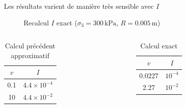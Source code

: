 \documentclass[10pt]{beamer}
\begin{document}
\begin{frame}{Les résultats varient de manière très sensible avec $I$}
    \begin{figure}[h]
        \centering
        \scalebox{0.5}{}
        \caption{Recalcul $I$ exact ($\sigma_3 = 300\,\text{kPa}$, $R = 0.005\,\text{m}$)}
    \end{figure}
    \begin{columns}
        \begin{column}{0.45\textwidth}
            \begin{table}[h]
                \centering
                \begin{tabular}{c c}
                    \hline
                    $v$ & $I$                  \\
                    \hline
                    0.1 & $4.4 \times 10^{-4}$ \\
                    10  & $4.4 \times 10^{-2}$ \\
                    \hline
                \end{tabular}
                \caption{Calcul précédent approximatif}
            \end{table}
        \end{column}
        \begin{column}{0.45\textwidth}
            \begin{table}[h]
                \centering
                \begin{tabular}{c c}
                    \hline
                    $v$    & $I$       \\
                    \hline
                    0.0227 & $10^{-4}$ \\
                    2.27   & $10^{-2}$ \\
                    \hline
                \end{tabular}
                \caption{Calcul exact}
            \end{table}
        \end{column}
    \end{columns}
\end{frame}
\end{document}
